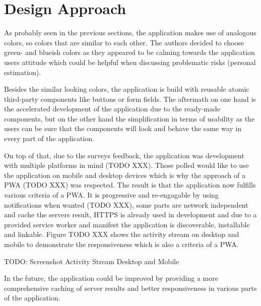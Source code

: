 
\section{Design Approach}
\label{sec:implementationDesign}

As probably seen in the previous sections, the application makes use of analogous colors, so colors that are similar to each other. The authors decided to choose green- and blueish colors as they appeared to be calming towards the application users attitude which could be helpful when discussing problematic risks (personal estimation).

Besides the similar looking colors, the application is build with reusable atomic third-party components like buttons or form fields. The aftermath on one hand is the accelerated development of the application due to the ready-made components, but on the other hand the simplification in terms of usability as the users can be sure that the components will look and behave the same way in every part of the application.

On top of that, due to the surveys feedback, the application was development with multiple platforms in mind (TODO XXX). Those polled would like to use the application on mobile and desktop devices which is why the approach of a PWA (TODO XXX) was respected. The result is that the application now fulfills various criteria of a PWA. It is progressive and re-engagable by using notifications when wanted (TODO XXX), some parts are network independent and cache the servers result, HTTPS is already used in development and due to a provided service worker and manifest the application is discoverable, installable and linkable. Figure TODO XXX shows the activity stream on desktop and mobile to demonstrate the responsiveness which is also a criteria of a PWA.

TODO: Screenshot Activity Stream Desktop and Mobile

In the future, the application could be improved by providing a more comprehensive caching of server results and better responsiveness in various parts of the application.
